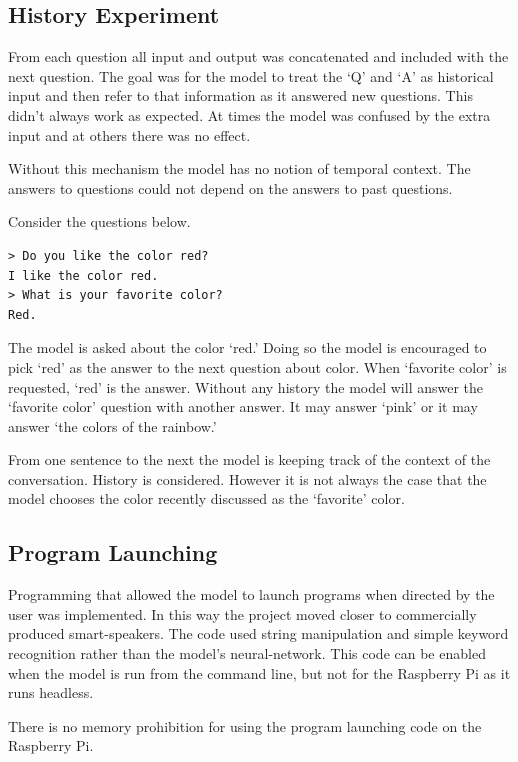 \subsection{History Experiment}
From each question all input and output was concatenated and included with the next question. The goal was for the model to treat the `Q' and `A' as historical input and then refer to that information as it answered new questions. This didn't always work as expected. At times the model was confused by the extra input and at others there was no effect. 

Without this mechanism the model has no notion of temporal context. The answers to questions could not depend on the answers to past questions. %

Consider the questions below.
\begin{verbatim}
> Do you like the color red?
I like the color red.
> What is your favorite color?
Red.
\end{verbatim}

\label{install-gpt2-history}

The model is asked about the color `red.' Doing so the model is encouraged to pick `red' as the answer to the next question about color. When `favorite color' is requested, `red' is the answer. Without any history the model will answer the `favorite color' question with another answer. It may answer `pink' or it may answer `the colors of the rainbow.' 

From one sentence to the next the model is keeping track of the context of the conversation. History is considered. However it is not always the case that the model chooses the color recently discussed as the `favorite' color.


\subsection{Program Launching}

Programming that allowed the model to launch programs when directed by the user was implemented. In this way the project moved closer to commercially produced smart-speakers. The code used string manipulation and simple keyword recognition rather than the model's neural-network. This code can be enabled when the model is run from the command line, but not for the Raspberry Pi as it runs headless.

There is no memory prohibition for using the program launching code on the Raspberry Pi. %

